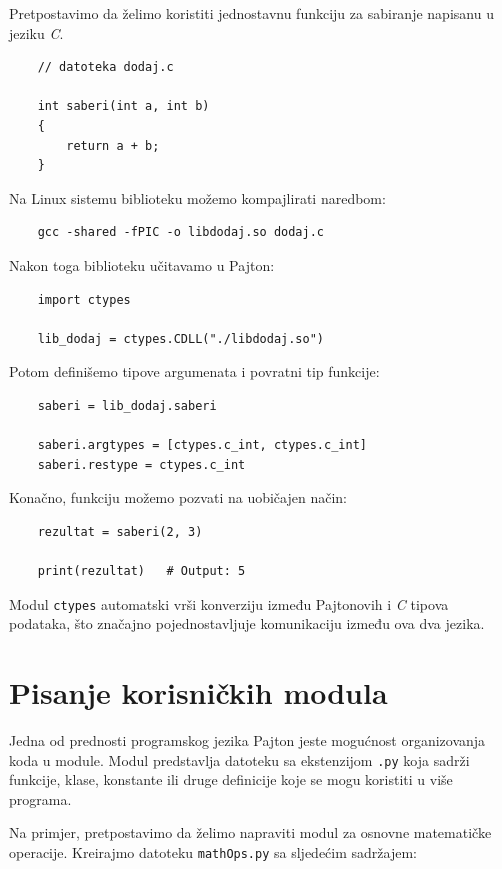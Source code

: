 Pretpostavimo da želimo koristiti jednostavnu funkciju za sabiranje napisanu u jeziku \textit{C}.

\begin{verbatim}
	// datoteka dodaj.c
	
	int saberi(int a, int b)
	{
		return a + b;
	}
\end{verbatim}

Na Linux sistemu biblioteku možemo kompajlirati naredbom:

\begin{verbatim}
	gcc -shared -fPIC -o libdodaj.so dodaj.c
\end{verbatim}

Nakon toga biblioteku učitavamo u Pajton:

\begin{verbatim}
	import ctypes
	
	lib_dodaj = ctypes.CDLL("./libdodaj.so")
\end{verbatim}

Potom definišemo tipove argumenata i povratni tip funkcije:

\begin{verbatim}
	saberi = lib_dodaj.saberi
	
	saberi.argtypes = [ctypes.c_int, ctypes.c_int]
	saberi.restype = ctypes.c_int
\end{verbatim}

Konačno, funkciju možemo pozvati na uobičajen način:

\begin{verbatim}
	rezultat = saberi(2, 3)
	
	print(rezultat)   # Output: 5
\end{verbatim}

Modul \texttt{ctypes} automatski vrši konverziju između Pajtonovih i \textit{C} tipova podataka, što značajno pojednostavljuje komunikaciju između ova dva jezika.

\section{Pisanje korisničkih modula}

Jedna od prednosti programskog jezika Pajton jeste mogućnost organizovanja koda u module. Modul predstavlja datoteku sa ekstenzijom \texttt{.py} koja sadrži funkcije, klase, konstante ili druge definicije koje se mogu koristiti u više programa.

Na primjer, pretpostavimo da želimo napraviti modul za osnovne matematičke operacije. Kreirajmo datoteku \texttt{mathOps.py} sa sljedećim sadržajem:


